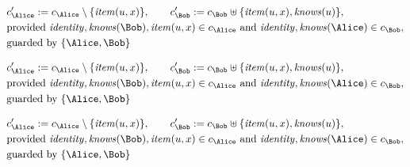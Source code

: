 \begin{align*}
&
c'_
{
\Alice
}
 := 
c_
{
\Alice
}
 \setminus 
\{
\mathit{
item
}
(
u
,
x
)
\}
, \qquad 
c'_
{
\Bob
}
 := 
c_
{
\Bob
}
 \uplus 
\{
\mathit{
item
}
(
u
,
x
)
,
\mathit{
knows
}
(
u
)
\}
,\\
&
\text{provided } 
\mathit{
identity
}
,
\mathit{
knows
}
(
\Bob
)
,
\mathit{
item
}
(
u
,
x
)
 \in c_
{
\Alice
}
 \text{ and } 
\mathit{
identity
}
,
\mathit{
knows
}
(
\Alice
)
 \in c_
{
\Bob
}
,\\
&
\text{guarded by } \{
\Alice
,
\Bob
\}
\end{align*}

\begin{align*}
&
c'_
{
\Alice
}
 := 
c_
{
\Alice
}
 \setminus 
\{
\mathit{
item
}
(
u
,
x
)
\}
, \qquad 
c'_
{
\Bob
}
 := 
c_
{
\Bob
}
 \uplus 
\{
\mathit{
item
}
(
u
,
x
)
,
\mathit{
knows
}
(
u
)
\}
,\\
&
\text{provided } 
\mathit{
identity
}
,
\mathit{
knows
}
(
\Bob
)
,
\mathit{
item
}
(
u
,
x
)
 \in c_
{
\Alice
}
 \text{ and } 
\mathit{
identity
}
,
\mathit{
knows
}
(
\Alice
)
 \in c_
{
\Bob
}
,\\
&
\text{guarded by } \{
\Alice
,
\Bob
\}
\end{align*}

\begin{align*}
&
c'_
{
\Alice
}
 := 
c_
{
\Alice
}
 \setminus 
\{
\mathit{
item
}
(
u
,
x
)
\}
, \qquad 
c'_
{
\Bob
}
 := 
c_
{
\Bob
}
 \uplus 
\{
\mathit{
item
}
(
u
,
x
)
,
\mathit{
knows
}
(
u
)
\}
,\\
&
\text{provided } 
\mathit{
identity
}
,
\mathit{
knows
}
(
\Bob
)
,
\mathit{
item
}
(
u
,
x
)
 \in c_
{
\Alice
}
 \text{ and } 
\mathit{
identity
}
,
\mathit{
knows
}
(
\Alice
)
 \in c_
{
\Bob
}
,\\
&
\text{guarded by } \{
\Alice
,
\Bob
\}
\end{align*}
